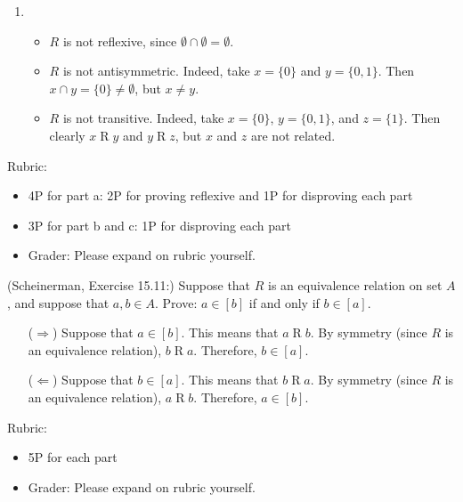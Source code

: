 \documentclass{article}
\theoremstyle{definition}
\begin{document}
\begin{solution}
\begin{enumerate}
	\item 
	\begin{itemize}
		\item $ R$ is not reflexive, since $\emptyset \cap \emptyset = \emptyset$.
		\item $ R$ is not antisymmetric. Indeed, take $x = \{ 0 \}$ and $y = \{0,1\}$. Then $x \cap y = \{0 \} \neq \emptyset$, but $x \neq y$.
		\item $ R$ is not transitive. Indeed, take $x = \{ 0 \}$, $y = \{0,1\}$, and $z = \{1\}$. Then clearly $x \mathrel{R}y$ and $y \mathrel{R}z$, but $x$ and $z$ are not related.
	\end{itemize}
     \end{enumerate}
 {\color{red} Rubric:
\begin{itemize}
\item 4P for part a: 2P for proving reflexive and 1P for disproving each part
\item 3P for part b and c: 1P for disproving each part
\item Grader: Please expand on rubric yourself.
\end{itemize}}
\end{solution}


\begin{question}
    (Scheinerman, Exercise 15.11:)
    Suppose that $R$ is an equivalence relation on  set $A$, and suppose that $a, b \in A$.
    Prove: $a \in [b]$ if and only if $b \in [a]$.
\end{question}
\begin{solution}
    \begin{itemize}
    \item[($\Rightarrow$)] Suppose that $a \in [b]$.  This means that $a\mathrel{R}b$.  By symmetry (since $R$ is an equivalence relation), $b\mathrel{R}a$.  Therefore, $b \in [a]$.
    \item[($\Leftarrow$)] Suppose that $b \in [a]$.  This means that $b\mathrel{R}a$.  By symmetry (since $R$ is an equivalence relation), $a\mathrel{R}b$.  Therefore, $a \in [b]$.
    \end{itemize}
 {\color{red} Rubric:
\begin{itemize}
\item 5P for each part
\item Grader: Please expand on rubric yourself.
\end{itemize}}
\end{solution}
\end{document}
